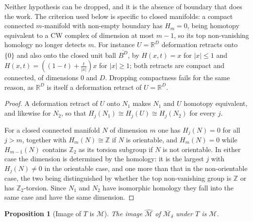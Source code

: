 \documentclass[11pt]{amsart}%
\theoremstyle{plain}
\newtheorem{proposition}[definition]{Proposition}
\newcommand{\1}{\mathbf{1}}
\newcommand{\M}{\mathcal{M}}
\begin{document}
Neither hypothesis can be dropped, and it is the absence of boundary that does the work. The
criterion used below is specific to closed manifolds: a compact connected $m$-manifold with
non-empty boundary has $H_m=0$, being homotopy equivalent to a CW complex of dimension at most
$m-1$, so its top non-vanishing homology no longer detects $m$. For instance $U=\mathbb{R}^D$
deformation retracts onto $\{0\}$ and also onto the closed unit ball $\overline{B^D}$, by
$H(x,t)=x$ for $|x|\le 1$ and $H(x,t)=\left((1-t)+\frac{t}{|x|}\right)x$ for $|x|\ge 1$; both retracts are
compact and connected, of dimensions $0$ and $D$. Dropping compactness fails for the same reason,
as $\mathbb{R}^D$ is itself a deformation retract of $U=\mathbb{R}^D$.

\begin{proof}
    A deformation retract of $U$ onto $N_1$ makes $N_1$ and $U$ homotopy equivalent, and likewise
    for $N_2$, so that $H_j(N_1)\cong H_j(U)\cong H_j(N_2)$ for every $j$.

    For a closed connected manifold $N$ of dimension $m$ one has $H_j(N)=0$ for all $j>m$, together
    with $H_m(N)\cong\mathbb{Z}$ if $N$ is orientable, and $H_m(N)=0$ while $H_{m-1}(N)$ contains
    $\mathbb{Z}_2$ as its torsion subgroup if $N$ is not orientable. In either case the dimension
    is determined by the homology: it is the largest $j$ with $H_j(N)\neq 0$ in the orientable
    case, and one more than that in the non-orientable case, the two being distinguished by whether
    the top non-vanishing group is $\mathbb{Z}$ or has $\mathbb{Z}_2$-torsion. Since $N_1$ and
    $N_2$ have isomorphic homology they fall into the same case and have the same dimension.
\end{proof}

\begin{proposition}[Image of $T$ is $\M$]
    \label{Prop:ImTM}
    The image $\widehat{\M}$ of $\overline{\M_\delta}$ under $T$ is $\M$.
\end{proposition}
\end{document}
